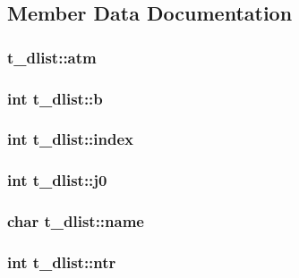 \subsection{\-Member \-Data \-Documentation}
\hypertarget{structt__dlist_a48354c3dff71d25f717c31ea2b206828}{
\subsubsection[{atm}]{ {\bf t\-\_\-dlist\-::atm}}}\label{structt__dlist_a48354c3dff71d25f717c31ea2b206828}
\hypertarget{structt__dlist_acacdaaf1f840732ae862d2b7fa8ae275}{
\subsubsection[{b}]{\setlength{\rightskip}{0pt plus 5cm}int {\bf t\-\_\-dlist\-::b}}}\label{structt__dlist_acacdaaf1f840732ae862d2b7fa8ae275}
\hypertarget{structt__dlist_aee6e8d6ae8acc59a8d0b146f919ce711}{
\subsubsection[{index}]{\setlength{\rightskip}{0pt plus 5cm}int {\bf t\-\_\-dlist\-::index}}}\label{structt__dlist_aee6e8d6ae8acc59a8d0b146f919ce711}
\hypertarget{structt__dlist_a8b22057bf73239f9faa29cc34a7917fb}{
\subsubsection[{j0}]{\setlength{\rightskip}{0pt plus 5cm}int {\bf t\-\_\-dlist\-::j0}}}\label{structt__dlist_a8b22057bf73239f9faa29cc34a7917fb}
\hypertarget{structt__dlist_aa0924568349a283a048088efc8146886}{
\subsubsection[{name}]{\setlength{\rightskip}{0pt plus 5cm}char {\bf t\-\_\-dlist\-::name}}}\label{structt__dlist_aa0924568349a283a048088efc8146886}
\hypertarget{structt__dlist_ac3f3f0c07bdc91872006550459858c37}{
\subsubsection[{ntr}]{\setlength{\rightskip}{0pt plus 5cm}int {\bf t\-\_\-dlist\-::ntr}}}\label{structt__dlist_ac3f3f0c07bdc91872006550459858c37}
